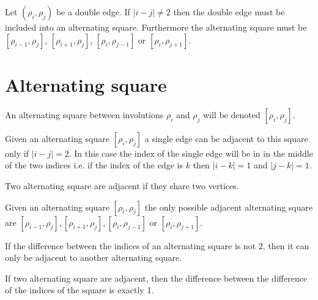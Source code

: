 \begin{corollary}
  \label{continue-double-edge}
  Let $(\rho_i, \rho_j)$ be a double edge. If $|i - j| \neq 2$ then the double edge must be included into an alternating square. Furthermore the alternating square must be  $[\rho_{i-1}, \rho_j]$, $[\rho_{i+1}, \rho_j]$, $[\rho_i, \rho_{j-1}]$ or $[\rho_i, \rho_{j+1}]$.
\end{corollary}

\section{Alternating square}

\begin{notation}
  An alternating square between involutions $\rho_i$ and $\rho_j$ will be denoted $[\rho_i, \rho_j]$.
\end{notation}

\begin{proposition}
  \label{square-connection}
  Given an alternating square $[\rho_i, \rho_j]$ a single edge can be adjacent to this square only if $|i - j| = 2$. In this case the index of the single edge will be in in the middle of the two indices i.e. if the index of the edge is $k$ then $|i-k| = 1$ and $|j-k| = 1$.
\end{proposition}

\begin{definition}
  Two alternating square are adjacent if they share two vertices.
\end{definition}

\begin{proposition}
  \label{adjacent-squares}
  Given an alternating square $[\rho_i, \rho_j]$ the only possible adjacent alternating square are $[\rho_{i-1}, \rho_j], [\rho_{i+1}, \rho_j], [\rho_i, \rho_{j-1}]$ or $[\rho_i, \rho_{j+1}]$.
\end{proposition}

\begin{corollary}
  \label{continue-alternating-square}
  If the difference between the indices of an alternating square is not 2, then it can only be adjacent to another alternating square.
\end{corollary}

\begin{corollary}
  If two alternating square are adjacent, then the difference between the difference of the indices of the square is exactly 1.
\end{corollary}

